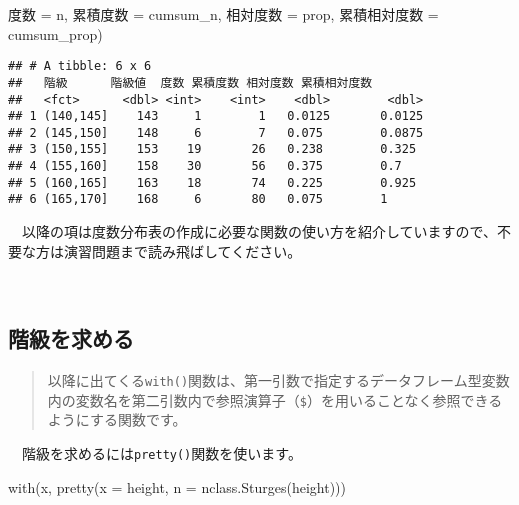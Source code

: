 \documentclass[
  12pt,
]{book}
\newenvironment{Shaded}{\begin{snugshade}}{\end{snugshade}}
\newcommand{\AttributeTok}[1]{\textcolor[rgb]{0.77,0.63,0.00}{#1}}
\newcommand{\FunctionTok}[1]{\textcolor[rgb]{0.00,0.00,0.00}{#1}}
\newcommand{\NormalTok}[1]{#1}
\newcommand{\OtherTok}[1]{\textcolor[rgb]{0.56,0.35,0.01}{#1}}
\newcommand{\StringTok}[1]{\textcolor[rgb]{0.31,0.60,0.02}{#1}}
\begin{document}
\begin{Shaded}
\begin{Highlighting}[]
                \StringTok{\textasciigrave{}}\AttributeTok{度数}\StringTok{\textasciigrave{}} \OtherTok{=}\NormalTok{ n, }\StringTok{\textasciigrave{}}\AttributeTok{累積度数}\StringTok{\textasciigrave{}} \OtherTok{=}\NormalTok{ cumsum\_n,}
                \StringTok{\textasciigrave{}}\AttributeTok{相対度数}\StringTok{\textasciigrave{}} \OtherTok{=}\NormalTok{ prop, }\StringTok{\textasciigrave{}}\AttributeTok{累積相対度数}\StringTok{\textasciigrave{}} \OtherTok{=}\NormalTok{ cumsum\_prop)}
\end{Highlighting}
\end{Shaded}

\begin{verbatim}
## # A tibble: 6 x 6
##   階級      階級値  度数 累積度数 相対度数 累積相対度数
##   <fct>      <dbl> <int>    <int>    <dbl>        <dbl>
## 1 (140,145]    143     1        1   0.0125       0.0125
## 2 (145,150]    148     6        7   0.075        0.0875
## 3 (150,155]    153    19       26   0.238        0.325 
## 4 (155,160]    158    30       56   0.375        0.7   
## 5 (160,165]    163    18       74   0.225        0.925 
## 6 (165,170]    168     6       80   0.075        1
\end{verbatim}

　以降の項は度数分布表の作成に必要な関数の使い方を紹介していますので、不要な方は演習問題まで読み飛ばしてください。

　

\hypertarget{ux968eux7d1aux3092ux6c42ux3081ux308b}{%
\subsection{階級を求める}\label{ux968eux7d1aux3092ux6c42ux3081ux308b}}

\begin{quote}
以降に出てくる\texttt{with()}関数は、第一引数で指定するデータフレーム型変数内の変数名を第二引数内で参照演算子（\texttt{\$}）を用いることなく参照できるようにする関数です。
\end{quote}

　階級を求めるには\texttt{pretty()}関数を使います。

\begin{Shaded}
\begin{Highlighting}[]
\FunctionTok{with}\NormalTok{(x, }\FunctionTok{pretty}\NormalTok{(}\AttributeTok{x =}\NormalTok{ height, }\AttributeTok{n =} \FunctionTok{nclass.Sturges}\NormalTok{(height)))}
\end{Highlighting}
\end{Shaded}
\end{document}
